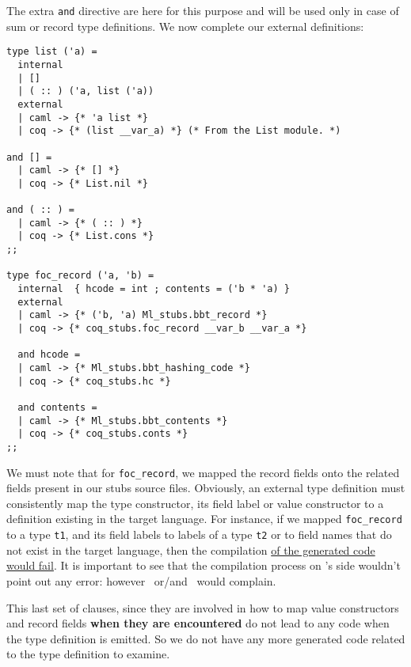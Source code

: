 The extra {\tt and} directive are here for this purpose and will be
used only in case of sum or record type definitions. We now complete
our external definitions:

{\footnotesize
\begin{lstlisting}[title=External type definitions (3)]
type list ('a) =
  internal
  | []
  | ( :: ) ('a, list ('a))
  external
  | caml -> {* 'a list *}
  | coq -> {* (list __var_a) *} (* From the List module. *)

and [] =
  | caml -> {* [] *}
  | coq -> {* List.nil *}

and ( :: ) =
  | caml -> {* ( :: ) *}
  | coq -> {* List.cons *}
;;

type foc_record ('a, 'b) =
  internal  { hcode = int ; contents = ('b * 'a) }
  external
  | caml -> {* ('b, 'a) Ml_stubs.bbt_record *}
  | coq -> {* coq_stubs.foc_record __var_b __var_a *}

  and hcode =
  | caml -> {* Ml_stubs.bbt_hashing_code *}
  | coq -> {* coq_stubs.hc *}

  and contents =
  | caml -> {* Ml_stubs.bbt_contents *}
  | coq -> {* coq_stubs.conts *}
;;
\end{lstlisting}}

We must note that for {\tt foc\_record}, we mapped the record fields
onto the related fields present in our stubs source files. Obviously,
an external type definition must consistently map the type
constructor, its field label or value constructor to a definition
existing in the target language. For instance, if we mapped
{\tt foc\_record} to a type {\tt t1}, and its field labels to labels
of a type {\tt t2} or to field names that do not exist in the target
language, then the compilation \underline{of the generated code would
fail}. It is important to see that the compilation process on
\focalize's side wouldn't point out any error: however \coq\ or/and
\ocaml\ would complain.

\medskip
This last set of clauses, since they are involved in how to map value
constructors and record fields {\bf when they are encountered} do not
lead to any code when the type definition is emitted. So we do not
have any more generated code related to the type definition to
examine.



